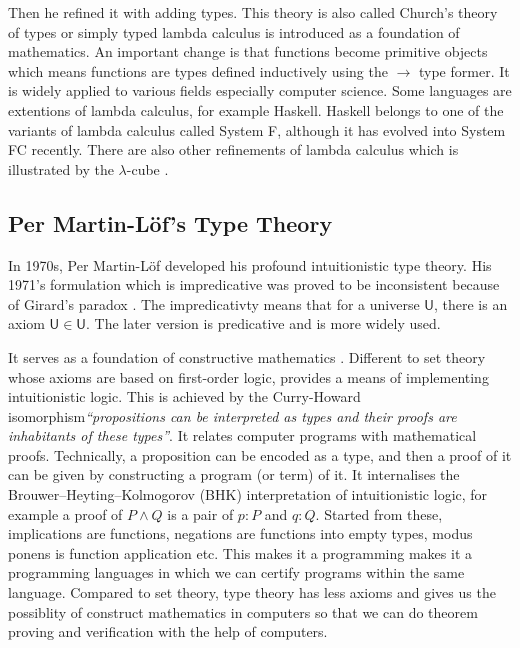 Then he refined it with adding types. This theory is also called
Church's theory of types or simply typed lambda calculus is
introduced as a foundation of mathematics. An important change is that functions become primitive objects which means functions are types defined inductively using the $\rightarrow$ type former. It is widely applied to
various fields especially computer science. Some languages are extentions of lambda calculus, for example Haskell. Haskell belongs to one of the variants of lambda calculus called System F, although it has evolved into System FC recently. There are also other refinements of lambda calculus which is illustrated by the $\lambda$-cube \cite{barendregt1991introduction}.



\subsection{Per Martin-L\"{o}f's Type Theory}

In 1970s, Per Martin-L\"{o}f \cite{per:71,per:82}  developed his profound intuitionistic type theory. His 1971's formulation which is impredicative was proved to be inconsistent because of Girard's paradox \cite{hurkens1995simplification}. The impredicativty means that for a universe $\mathsf{U}$, there is an axiom $\mathsf{U} \in \mathsf{U}$. The later version is predicative and is more widely used.


It serves as a foundation of constructive mathematics \cite{martin1984intuitionistic}. Different to set theory whose axioms are based on first-order logic, \mltt provides a means of implementing intuitionistic logic. This is achieved by the Curry-Howard
isomorphism\emph{``propositions can be interpreted as types and their
  proofs are inhabitants of these types''}. It relates computer programs with mathematical proofs. Technically, a proposition can be encoded as a type, and then a proof of it can be given by constructing a program (or term) of it. It internalises the  Brouwer–Heyting–Kolmogorov (BHK) interpretation of intuitionistic logic, for example a proof of $P \wedge Q$ is a pair of $p : P$ and $q : Q$.
Started from these, implications are functions, negations are functions into empty types, modus ponens is function application etc. This makes it a programming makes it a programming languages in which we can certify programs within the same language.
Compared to set theory, type theory has less axioms and gives us the possiblity of construct mathematics in computers so that we can do theorem proving and verification with the help of computers.

